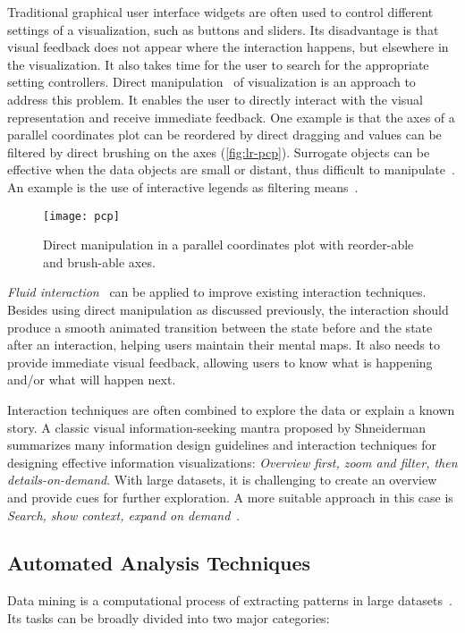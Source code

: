 Traditional graphical user interface widgets are often used to control different settings of a visualization, such as buttons and sliders. Its disadvantage is that visual feedback does not appear where the interaction happens, but elsewhere in the visualization. It also takes time for the user to search for the appropriate setting controllers. Direct manipulation~\cite{Shneiderman1982} of visualization is an approach to address this problem. It enables the user to directly interact with the visual representation and receive immediate feedback. One example is that the axes of a parallel coordinates plot can be reordered by direct dragging and values can be filtered by direct brushing on the axes (\autoref{fig:lr-pcp}). Surrogate objects can be effective when the data objects are small or distant, thus difficult to manipulate~\cite{Kwon2011}. An example is the use of interactive legends as filtering means~\cite{Riche2010b}.

\begin{figure}[!htb]
	\centering
	\texttt{[image: pcp]}
	\caption[Direct manipulation in a parallel coordinates plot]{Direct manipulation in a parallel coordinates plot with reorder-able and brush-able axes.}
	\label{fig:lr-pcp}
\end{figure}

\emph{Fluid interaction}~\cite{Elmqvist2011} can be applied to improve existing interaction techniques. Besides using direct manipulation as discussed previously, the interaction should produce a smooth animated transition between the state before and the state after an interaction, helping users maintain their mental maps. It also needs to provide immediate visual feedback, allowing users to know what is happening and/or what will happen next.

Interaction techniques are often combined to explore the data or explain a known story. A classic visual information-seeking mantra proposed by Shneiderman~\cite{Shneiderman1996} summarizes many information design guidelines and interaction techniques for designing effective information visualizations: \emph{Overview first, zoom and filter, then details-on-demand}. With large datasets, it is challenging to create an overview and provide cues for further exploration. A more suitable approach in this case is \emph{Search, show context, expand on demand}~\cite{VanHam2009}.

\subsection{Automated Analysis Techniques}
\label{sub:lr-analysis}
Data mining is a computational process of extracting patterns in large datasets~\cite{Tan2006}. Its tasks can be broadly divided into two major categories:

